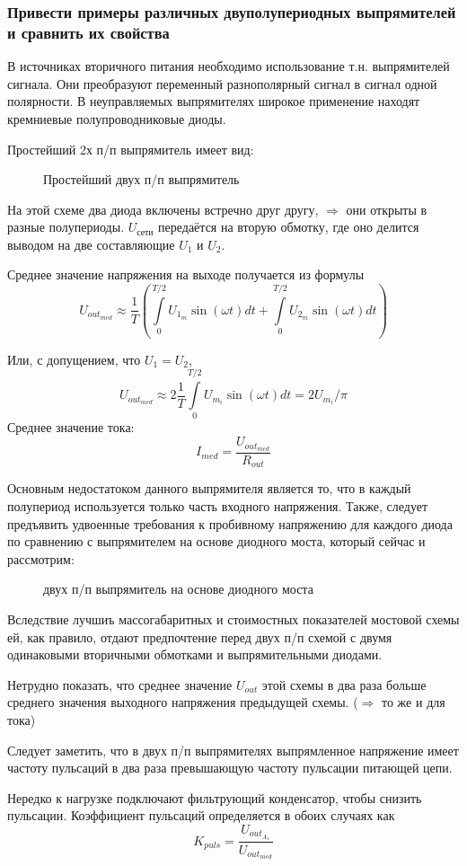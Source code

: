 \subsubsection{Привести примеры различных двуполупериодных выпрямителей и сравнить их свойства}

В источниках вторичного питания необходимо использование т.н. выпрямителей сигнала. Они преобразуют переменный разнополярный сигнал в сигнал одной полярности. В неуправляемых выпрямителях широкое применение находят кремниевые полупроводниковые диоды. 

Простейший 2х п/п выпрямитель имеет вид:
\begin{center}
	\begin{figure}[h!]
		\caption{Простейший двух п/п выпрямитель}
	\end{figure}
\end{center}

На этой схеме два диода включены встречно друг другу, $\Rightarrow$ они открыты в разные полупериоды. $U_{\textit{сети}}$ передаётся на вторую обмотку, где оно делится выводом на две составляющие $U_1$ и $U_2$.

Среднее значение напряжения на выходе получается из формулы
$$
U_{out_{med}} \approx \frac{1}{T}\left(\int \limits_0^{T/2} U_{1_m}\sin(\omega t)dt + \int \limits_0^{T/2} U_{2_m}\sin(\omega t)dt \right)
$$

Или, с допущением, что $U_1 = U_2$, 
$$
U_{out_{med}} \approx 2\frac{1}{T}\int \limits_0^{T/2} U_{m_i}\sin(\omega t)dt = 2U_{m_i}/\pi
$$
Среднее значение тока:
$$
I_{med} = \frac{U_{out_{med}}}{R_{out}}
$$

Основным недостатоком данного выпрямителя является то, что в каждый полупериод используется только часть входного напряжения. Также, следует предъявить удвоенные требования к пробивному напряжению для каждого диода по сравнению с выпрямителем на основе диодного моста, который сейчас и рассмотрим:
\begin{center}
	\begin{figure}[h!]
		\caption{двух п/п выпрямитель на основе диодного моста}
	\end{figure}
\end{center}

Вследствие лучшиъ массогабаритных и стоимостных показателей мостовой схемы ей, как правило, отдают предпочтение перед двух п/п схемой с двумя одинаковыми вторичными обмотками и выпрямительными диодами.

Нетрудно показать, что среднее значение $U_{out}$ этой схемы в два раза больше среднего значения выходного напряжения предыдущей схемы. ($\Rightarrow$ то же и для тока)

Следует заметить, что в двух п/п выпрямителях выпрямленное напряжение имеет частоту пульсаций в два раза превышающую частоту пульсации питающей цепи.

Нередко к нагрузке подключают фильтрующий конденсатор, чтобы снизить пульсации. Коэффициент пульсаций определяется в обоих случаях как
$$
K_{puls} = \frac{U_{out_{A_1}}}{U_{out_{med}}}
$$
 

